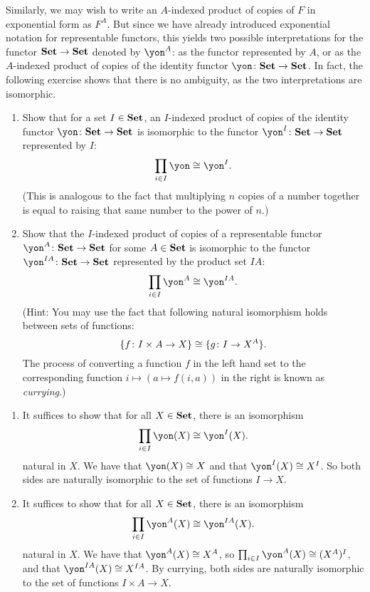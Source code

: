 \documentclass[Book-Poly]{subfiles}
\begin{document}
Similarly, we may wish to write an $A$-indexed product of copies of $F$ in exponential form as $F^A$.
But since we have already introduced exponential notation for representable functors, this yields two possible interpretations for the functor $\mathbf{Set}\to\mathbf{Set}$ denoted by $\yon^A$: as the functor represented by $A$, or as the $A$-indexed product of copies of the identity functor $\yon\colon\smset\to\smset$.
In fact, the following exercise shows that there is no ambiguity, as the two interpretations are isomorphic.

\begin{exercise}
    \begin{enumerate}
        \item Show that for a set $I\in\mathbf{Set}$, an $I$-indexed product of copies of the identity functor $\yon\colon\smset\to\smset$ is isomorphic to the functor $\yon^I\colon\smset\to\smset$ represented by $I$:
        \[
        \prod_{i\in I}\yon\iso\yon^I.
        \]
        (This is analogous to the fact that multiplying $n$ copies of a number together is equal to raising that same number to the power of $n$.)
        \item Show that the $I$-indexed product of copies of a representable functor $\yon^A\colon\smset\to\smset$ for some $A\in\mathbf{Set}$ is isomorphic to the functor $\yon^{IA}\colon\smset\to\smset$ represented by the product set $IA$:
        \[
        \prod_{i\in I}\yon^A\iso\yon^{IA}.
        \]
        (Hint: You may use the fact that following natural isomorphism holds between sets of functions:
        \[
        \{ f \colon I\times A\to X \} \cong \{ g \colon I\to X^A \}.
        \]
        The process of converting a function $f$ in the left hand set to the corresponding function $i\mapsto(a\mapsto f(i,a))$ in the right is known as \emph{currying}.) \qedhere
    \end{enumerate}
    \begin{solution}
        \begin{enumerate}
            \item It suffices to show that for all $X\in\mathbf{Set}$, there is an isomorphism
            \[
            \prod_{i\in I} \yon(X) \iso \yon^I(X).
            \]
            natural in $X$.
            We have that $\yon(X)\iso X$ and that $\yon^I(X)\iso X^I$.
            So both sides are naturally isomorphic to the set of functions $I\to X$.

            \item It suffices to show that for all $X\in\mathbf{Set}$, there is an isomorphism
            \[
            \prod_{i\in I} \yon^A(X) \iso \yon^{IA}(X).
            \]
            natural in $X$.
            We have that $\yon^A(X)\iso X^A$, so $\prod_{i\in I}\yon^A(X)\iso(X^A)^I$, and that $\yon^{IA}(X)\iso X^{IA}$.
            By currying, both sides are naturally isomorphic to the set of functions $I\times A\to X$.
        \end{enumerate}
    \end{solution}
\end{exercise}
\end{document}
